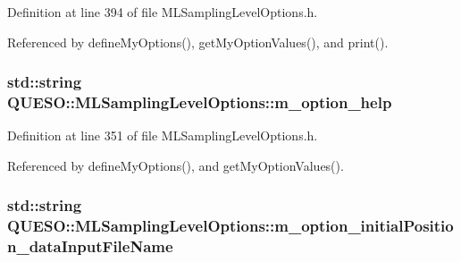 Definition at line 394 of file M\-L\-Sampling\-Level\-Options.\-h.



Referenced by define\-My\-Options(), get\-My\-Option\-Values(), and print().

\hypertarget{class_q_u_e_s_o_1_1_m_l_sampling_level_options_a5f29394c92a49c24e9c2725320ee3406}{
\subsubsection[{m\-\_\-option\-\_\-help}]{\setlength{\rightskip}{0pt plus 5cm}std\-::string Q\-U\-E\-S\-O\-::\-M\-L\-Sampling\-Level\-Options\-::m\-\_\-option\-\_\-help\hspace{0.3cm}{\ttfamily [private]}}}\label{class_q_u_e_s_o_1_1_m_l_sampling_level_options_a5f29394c92a49c24e9c2725320ee3406}


Definition at line 351 of file M\-L\-Sampling\-Level\-Options.\-h.



Referenced by define\-My\-Options(), and get\-My\-Option\-Values().

\hypertarget{class_q_u_e_s_o_1_1_m_l_sampling_level_options_a08ae170166172f72b1b98e523ce0d71c}{
\subsubsection[{m\-\_\-option\-\_\-initial\-Position\-\_\-data\-Input\-File\-Name}]{\setlength{\rightskip}{0pt plus 5cm}std\-::string Q\-U\-E\-S\-O\-::\-M\-L\-Sampling\-Level\-Options\-::m\-\_\-option\-\_\-initial\-Position\-\_\-data\-Input\-File\-Name\hspace{0.3cm}{\ttfamily [private]}}}\label{class_q_u_e_s_o_1_1_m_l_sampling_level_options_a08ae170166172f72b1b98e523ce0d71c}


